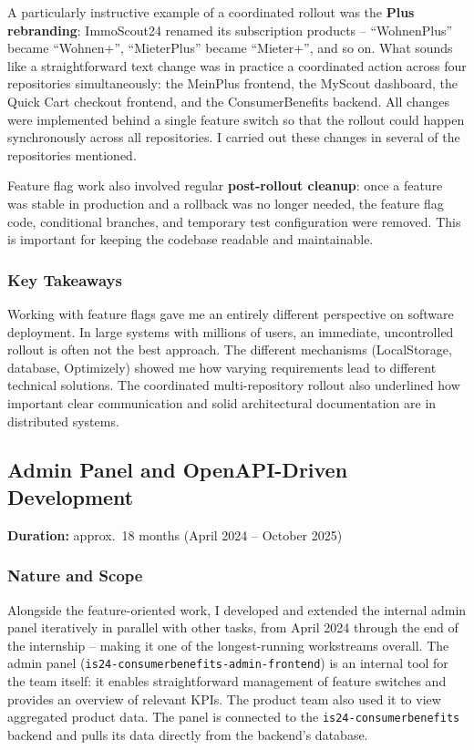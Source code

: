 \documentclass[a4paper, 12pt]{article}
\begin{document}
A particularly instructive example of a coordinated rollout was the \textbf{Plus
rebranding}: ImmoScout24 renamed its subscription products -- \enquote{WohnenPlus}
became \enquote{Wohnen+}, \enquote{MieterPlus} became \enquote{Mieter+}, and so on.
What sounds like a straightforward text change was in practice a coordinated action
across four repositories simultaneously: the MeinPlus frontend, the MyScout dashboard,
the Quick Cart checkout frontend, and the ConsumerBenefits backend. All changes were
implemented behind a single feature switch so that the rollout could happen
synchronously across all repositories. I carried out these changes in several of the
repositories mentioned.

Feature flag work also involved regular \textbf{post-rollout cleanup}: once a feature
was stable in production and a rollback was no longer needed, the feature flag code,
conditional branches, and temporary test configuration were removed. This is important
for keeping the codebase readable and maintainable.

\subsubsection*{Key Takeaways}

Working with feature flags gave me an entirely different perspective on software
deployment. In large systems with millions of users, an immediate, uncontrolled rollout
is often not the best approach. The different mechanisms (LocalStorage, database,
Optimizely) showed me how varying requirements lead to different technical solutions.
The coordinated multi-repository rollout also underlined how important clear
communication and solid architectural documentation are in distributed systems.

\subsection{Admin Panel and OpenAPI-Driven Development}

\noindent\textbf{Duration:} approx.\ 18 months (April 2024 -- October 2025)

\subsubsection*{Nature and Scope}

Alongside the feature-oriented work, I developed and extended the internal admin panel
iteratively in parallel with other tasks, from April 2024 through the end of the
internship -- making it one of the longest-running workstreams overall. The admin panel
(\texttt{is24-consumerbenefits-admin-frontend}) is an internal tool for the team
itself: it enables straightforward management of feature switches and provides an
overview of relevant KPIs. The product team also used it to view aggregated product
data. The panel is connected to the \texttt{is24-consumerbenefits} backend and pulls
its data directly from the backend's database.
\end{document}
